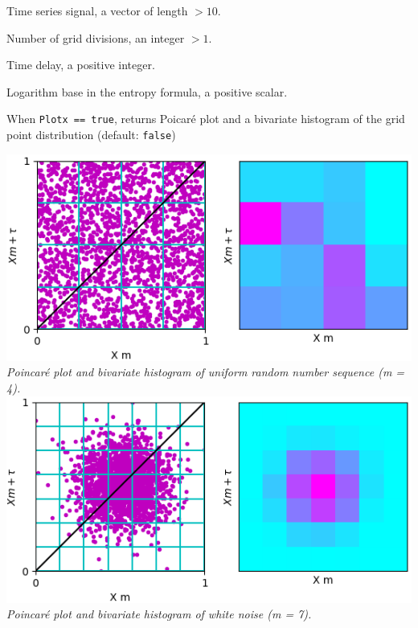 \documentclass[12pt, a4paper, titlepage, openany]{book}
\begin{document}
\begin{description}[labelsep=1cm, labelwidth=2cm, nosep, style=multiline,leftmargin=3cm]\footnotesize
\item[\texttt{Sig}]		Time series signal, a vector of length $> 10$.
\item[\texttt{m}]		Number of grid divisions, an integer $ > 1$.
\item[\texttt{tau}]		Time delay, a positive integer.
\item[\texttt{Logx}]	Logarithm base in the entropy formula, a positive scalar.
\item[\texttt{Plotx}]	When \texttt{Plotx == true}, returns Poicaré plot and a bivariate histogram of the grid point distribution (default: \texttt{false})
\item[ ]			\includegraphics[scale=.5]{Grid1.png}\\
			\textit{Poincaré plot and bivariate histogram of uniform random number sequence (m = 4).\\
					\includegraphics[scale=.5]{Grid2.png}\\
					Poincaré plot and bivariate histogram of white noise (m = 7).}
\end{description}
\end{document}
